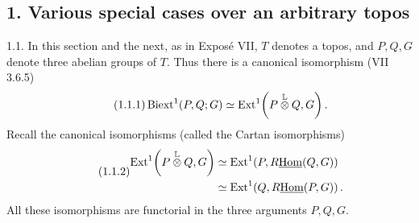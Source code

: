 
\subsection*{1. Various special cases over an arbitrary topos}

1.1. In this section and the next, as in Expos\'e VII, $T$ denotes a
topos, and $P,Q,G$ denote three abelian groups of $T$.  Thus there is a
canonical isomorphism (VII 3.6.5)
\begin{equation}\tag{1.1.1}
 \operatorname{Biext}^1(P,Q;G)
 \simeq
 \operatorname{Ext}^1\!\left(P\mathbin{\overset{\mathbb L}{\otimes}}Q,G\right).
\end{equation}
Recall the canonical isomorphisms (called the Cartan isomorphisms)
\begin{equation}\tag{1.1.2}
\begin{split}
 \Ext^1\!\left(P\mathbin{\overset{\mathbb L}{\otimes}}Q,G\right)
 &\simeq \Ext^1\!\left(P,R\uHom(Q,G)\right)\\
 &\simeq \Ext^1\!\left(Q,R\uHom(P,G)\right).
\end{split}
\end{equation}
All these isomorphisms are functorial in the three arguments $P,Q,G$.

